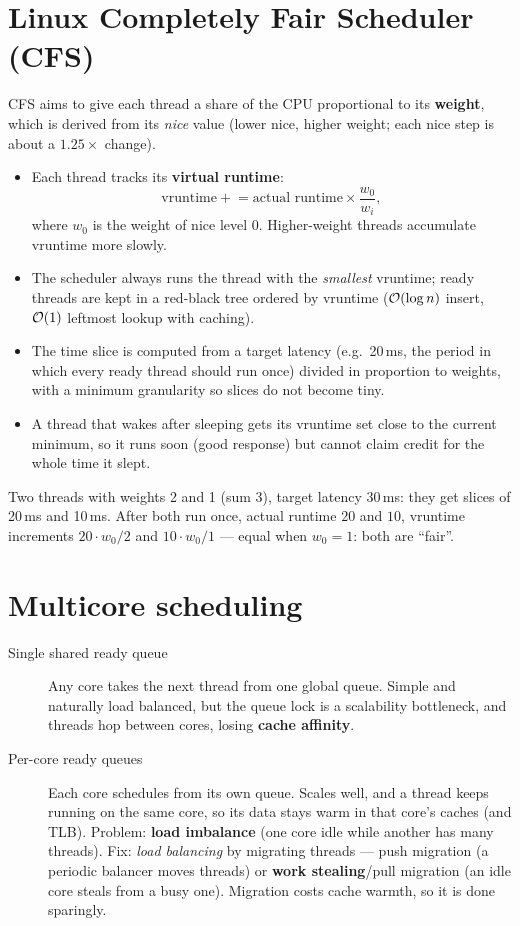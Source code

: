 \section{Linux Completely Fair Scheduler (CFS)}

CFS aims to give each thread a share of the CPU proportional to its \textbf{weight}, which is
derived from its \emph{nice} value (lower nice, higher weight; each nice step is about a
$1.25\times$ change).

\begin{itemize}
  \item Each thread tracks its \textbf{virtual runtime}:
    \[ \text{vruntime} \mathrel{+}= \text{actual runtime} \times \frac{w_0}{w_i}, \]
    where $w_0$ is the weight of nice level 0. Higher-weight threads accumulate vruntime more
    slowly.
  \item The scheduler always runs the thread with the \emph{smallest} vruntime; ready threads
    are kept in a red-black tree ordered by vruntime ($\mathcal{O}(\log n)$ insert, $\mathcal{O}(1)$
    leftmost lookup with caching).
  \item The time slice is computed from a target latency (e.g.\ 20\,ms, the period in which
    every ready thread should run once) divided in proportion to weights, with a minimum
    granularity so slices do not become tiny.
  \item A thread that wakes after sleeping gets its vruntime set close to the current minimum,
    so it runs soon (good response) but cannot claim credit for the whole time it slept.
\end{itemize}

\begin{example}
Two threads with weights 2 and 1 (sum 3), target latency 30\,ms: they get slices of 20\,ms and
10\,ms. After both run once, actual runtime $20$ and $10$, vruntime increments
$20 \cdot w_0/2$ and $10 \cdot w_0/1$ --- equal when $w_0 = 1$: both are ``fair''.
\end{example}

\section{Multicore scheduling}

\begin{description}
  \item[Single shared ready queue] Any core takes the next thread from one global queue. Simple
    and naturally load balanced, but the queue lock is a scalability bottleneck, and threads
    hop between cores, losing \textbf{cache affinity}.
  \item[Per-core ready queues] Each core schedules from its own queue. Scales well, and a thread
    keeps running on the same core, so its data stays warm in that core's caches (and TLB).
    Problem: \textbf{load imbalance} (one core idle while another has many threads). Fix:
    \emph{load balancing} by migrating threads --- push migration (a periodic balancer moves
    threads) or \textbf{work stealing}/pull migration (an idle core steals from a busy one).
    Migration costs cache warmth, so it is done sparingly.
\end{description}

